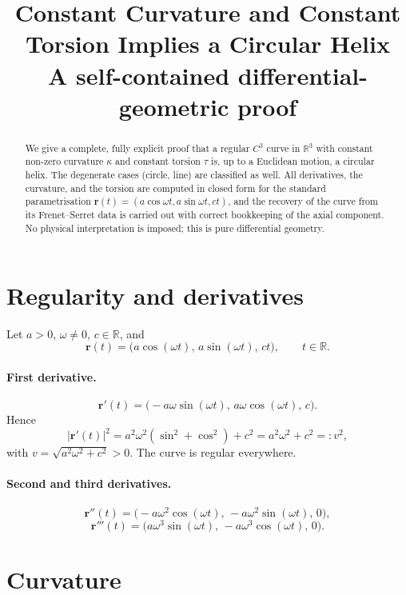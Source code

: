 \documentclass[11pt]{article}
\title{Constant Curvature and Constant Torsion Implies a Circular Helix\\
\large A self-contained differential-geometric proof}
\author{}
\date{}
\newcommand{\R}{\mathbb{R}}
\begin{document}
\maketitle

\begin{abstract}
We give a complete, fully explicit proof that a regular $C^{3}$ curve in
$\R^{3}$ with constant non-zero curvature $\kappa$ and constant torsion
$\tau$ is, up to a Euclidean motion, a circular helix. The degenerate cases
(circle, line) are classified as well. All derivatives, the curvature, and the
torsion are computed in closed form for the standard parametrisation
$\mathbf r(t)=(a\cos\omega t,a\sin\omega t,ct)$, and the recovery of the curve
from its Frenet--Serret data is carried out with correct bookkeeping of the
axial component. No physical interpretation is imposed; this is pure
differential geometry.
\end{abstract}

\section{Regularity and derivatives}
\label{sec:der}

Let $a>0$, $\omega\neq 0$, $c\in\R$, and
\[
\mathbf r(t)=\bigl(a\cos(\omega t),\,a\sin(\omega t),\,ct\bigr),\qquad t\in\R .
\]

\paragraph{First derivative.}
\[
\mathbf r'(t)=\bigl(-a\omega\sin(\omega t),\,a\omega\cos(\omega t),\,c\bigr).
\]
Hence
\[
|\mathbf r'(t)|^{2}=a^{2}\omega^{2}(\sin^{2}+\cos^{2})+c^{2}
=a^{2}\omega^{2}+c^{2}=:v^{2},
\]
with $v=\sqrt{a^{2}\omega^{2}+c^{2}}>0$. The curve is regular everywhere.

\paragraph{Second and third derivatives.}
\[
\mathbf r''(t)=\bigl(-a\omega^{2}\cos(\omega t),\,-a\omega^{2}\sin(\omega t),\,0\bigr),
\]
\[
\mathbf r'''(t)=\bigl(a\omega^{3}\sin(\omega t),\,-a\omega^{3}\cos(\omega t),\,0\bigr).
\]

\section{Curvature}
\label{sec:k}
\end{document}

